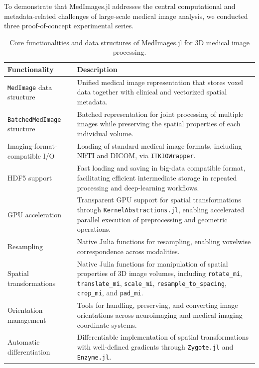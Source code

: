 \documentclass[a4paper,10pt]{elsarticle}
\begin{document}
To demonstrate that MedImages.jl addresses the central computational and metadata-related challenges of large-scale medical image analysis, we conducted three proof-of-concept experimental series.

\begin{table}[H]
\centering
\caption{Core functionalities and data structures of MedImages.jl for 3D medical image processing.}
\label{tab:medimages_functionalities}
\renewcommand{\arraystretch}{1.2}
\begin{tabular}{|p{}|p{}|}
\hline
\textbf{Functionality} & \textbf{Description} \\
\hline
\texttt{MedImage} data structure & Unified medical image representation that stores voxel data together with clinical and vectorized spatial metadata. \\
\hline
\texttt{BatchedMedImage} structure & Batched representation for joint processing of multiple images while preserving the spatial properties of each individual volume. \\
\hline
Imaging-format-compatible I/O & Loading of standard medical image formats, including NIfTI and DICOM, via \texttt{ITKIOWrapper}. \\
\hline
HDF5 support & Fast loading and saving in big-data compatible format, facilitating efficient intermediate storage in repeated processing and deep-learning workflows. \\
\hline
GPU acceleration & Transparent GPU support for spatial transformations through \texttt{KernelAbstractions.jl}, enabling accelerated parallel execution of preprocessing and geometric operations. \\
\hline
Resampling & Native Julia functions for resampling, enabling voxelwise correspondence across modalities. \\
\hline
Spatial transformations & Native Julia functions for manipulation of spatial properties of 3D image volumes, including \texttt{rotate\_mi}, \texttt{translate\_mi}, \texttt{scale\_mi}, \texttt{resample\_to\_spacing}, \texttt{crop\_mi}, and \texttt{pad\_mi}. \\
\hline
Orientation management & Tools for handling, preserving, and converting image orientations across neuroimaging and medical imaging coordinate systems. \\
\hline
Automatic differentiation & Differentiable implementation of spatial transformations with well-defined gradients through \texttt{Zygote.jl} and \texttt{Enzyme.jl}. \\
\hline
\end{tabular}
\end{table}
\end{document}
